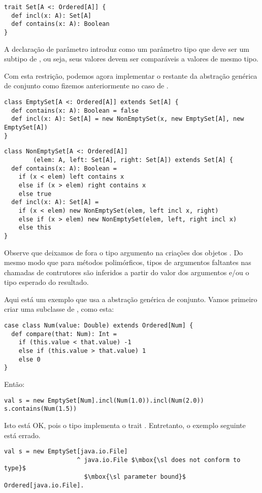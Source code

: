 \begin{lstlisting}
trait Set[A <: Ordered[A]] {
  def incl(x: A): Set[A]
  def contains(x: A): Boolean
}
\end{lstlisting}
A declaração de parâmetro  introduz  como um 
parâmetro tipo que deve ser um subtipo de , ou seja, seus 
valores devem ser comparáveis a valores de mesmo tipo.

Com esta restrição, podemos agora implementar o restante da abstração genérica 
de conjunto como fizemos anteriormente no caso de . 

\begin{lstlisting}
class EmptySet[A <: Ordered[A]] extends Set[A] {
  def contains(x: A): Boolean = false
  def incl(x: A): Set[A] = new NonEmptySet(x, new EmptySet[A], new EmptySet[A])
}
\end{lstlisting}

\begin{lstlisting}
class NonEmptySet[A <: Ordered[A]]
        (elem: A, left: Set[A], right: Set[A]) extends Set[A] {
  def contains(x: A): Boolean =
    if (x < elem) left contains x
    else if (x > elem) right contains x
    else true
  def incl(x: A): Set[A] =
    if (x < elem) new NonEmptySet(elem, left incl x, right)
    else if (x > elem) new NonEmptySet(elem, left, right incl x)
    else this
}
\end{lstlisting}

Observe que deixamos de fora o tipo argumento na criações dos objetos 
. Do mesmo modo que para métodos polimórficos, 
tipos de argumentos faltantes nas chamadas de contrutores são inferidos a 
partir do valor dos argumentos e/ou o tipo esperado do resultado. 

Aqui está um exemplo que usa a abstração genérica de conjunto. Vamos primeiro 
criar uma subclasse de \lstinline@Ordered@, como esta:

\begin{lstlisting}
case class Num(value: Double) extends Ordered[Num] {
  def compare(that: Num): Int =
    if (this.value < that.value) -1
    else if (this.value > that.value) 1
    else 0
}
\end{lstlisting}
Então:
\begin{lstlisting}
val s = new EmptySet[Num].incl(Num(1.0)).incl(Num(2.0))
s.contains(Num(1.5))
\end{lstlisting}
Isto está OK, pois o tipo  implementa o trait .
Entretanto, o exemplo seguinte está errado. 
\begin{lstlisting}
val s = new EmptySet[java.io.File]
                    ^ java.io.File $\mbox{\sl does not conform to type}$
                      $\mbox{\sl parameter bound}$ Ordered[java.io.File].
\end{lstlisting}

